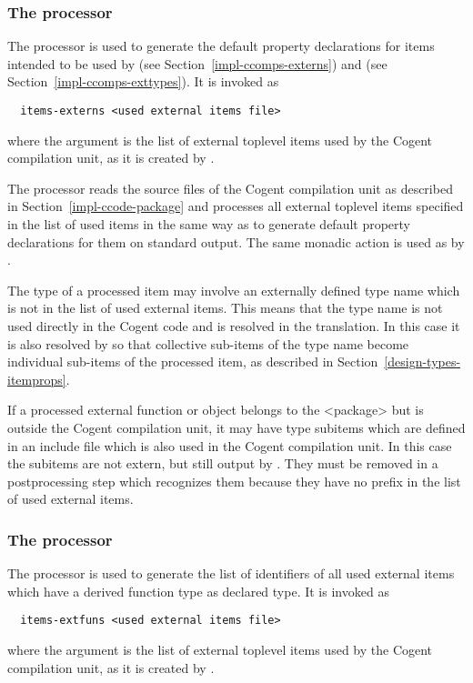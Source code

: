 \subsubsection{The processor }

The processor  is used to generate the default property declarations for items intended
to be used by  (see Section~\ref{impl-ccomps-externs}) and  
(see Section~\ref{impl-ccomps-exttypes}). It is invoked as
\begin{verbatim}
  items-externs <used external items file>
\end{verbatim}
where the argument is the list of external toplevel items used by the Cogent compilation unit, as it is created 
by .

The processor reads the source files of the Cogent compilation unit as described in Section~\ref{impl-ccode-package}
and processes all external toplevel items specified in the list of used items in the same way as 
to generate default property declarations for them on standard output. The same monadic action 
is used as by .

The type of a processed item may involve an externally defined type name which is not in the list of used external items.
This means that the type name is not used directly in the Cogent code and is resolved in the translation. In this case it is 
also resolved by  so that collective sub-items of the type name become individual sub-items of 
the processed item, as described in Section~\ref{design-types-itemprops}.

If a processed external function or object belongs to the <package> but is outside the Cogent compilation unit, it may
have type subitems which are defined in an include file which is also used in the Cogent compilation unit. In this
case the subitems are not extern, but still output by . They must be removed in a postprocessing
step which recognizes them because they have no prefix in the list of used external items.

\subsubsection{The processor }

The processor  is used to generate the list of identifiers of all used external items which 
have a derived function type as declared type. It is invoked as
\begin{verbatim}
  items-extfuns <used external items file>
\end{verbatim}
where the argument is the list of external toplevel items used by the Cogent compilation unit, as it is created 
by .

